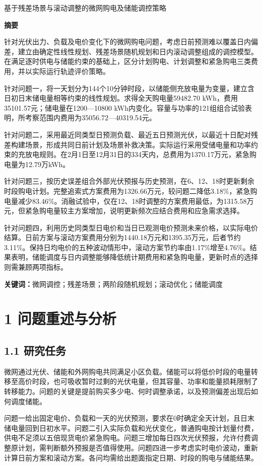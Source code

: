 \documentclass[UTF8,a4paper,zihao=-4,fontset=windows]{ctexart}
\begin{document}
\begin{center}{\heiti 基于残差场景与滚动调整的微网购电及储能调控策略}\end{center}
\begin{center}\large\bfseries 摘\quad 要\end{center}
针对光伏出力、负载及电价变化下的微网购电问题，考虑日前预测难以覆盖日内偏差，建立由确定性线性规划、残差场景随机规划和日内滚动调整组成的调控模型。在满足逐时供电与储能约束的基础上，区分计划购电、计划调整和紧急购电三类费用，并以实际运行轨迹评价策略。
\par
针对问题一，将一天划分为144个10分钟时段，以储能侧充放电量为变量，建立含日初日末储电量相等约束的线性规划。求得全天购电量59482.70 kWh，费用35101.57元；储电量在1200—10800 kWh内变化。容量与功率的121组组合试验表明，所考察范围内费用为35056.72—40319.54元。
\par
针对问题二，采用最近同类型日预测负载、最近五日预测光伏，以最近十日配对残差构建场景，形成共同日前计划及场景补救决策。实际运行采用受储电量和功率约束的充放电规则。在2月1日至12月31日的334天内，总费用为1370.17万元，紧急购电量为12.79万kWh。
\par
针对问题三，按历史误差组合外部光伏预报与历史预测，在6、12、18时更新剩余时段购电计划。完整追索式方案费用为1326.66万元，较问题二降低3.18\%，紧急购电量减少83.46\%。消融试验中，仅在12、18时调整的方案费用最低，为1315.58万元，但紧急购电量较主方案增加，说明更新频次应结合费用和应急需求选择。
\par
针对问题四，利用历史同类型日电价和当日已观测电价预测未来价格，以实际电价结算。日前方案与滚动方案费用分别为1440.18万元和1395.35万元，后者节约3.11\%。保持日均电价的五种波动情形中，滚动方案节约率由1.17\%增至4.76\%。结果表明，储能调度与日内调整能够降低统计期费用和紧急购电量，更新时点的选择则需兼顾两项指标。
\par
\textbf{关键词：}微网调控；残差场景；两阶段随机规划；滚动优化；储能调度
\par
\clearpage
\section{1 问题重述与分析}
\subsection{1.1 研究任务}
微网通过光伏、储能和外网购电共同满足小区负载。储能可以将低价时段的电量转移至高价时段，也可吸收暂时过剩的光伏电量，但其容量、功率和能量损耗限制了转移能力。问题的关键是提前购买多少电、何时调整承诺，以及预测偏差出现后如何调度储能。
\par
问题一给出固定电价、负载和一天的光伏预测，要求在0时确定全天计划，且日末储电量回到日初水平。问题二引入实际负载和光伏变化，普通购电按计划量付费，供电不足须以五倍现货电价紧急购电。问题三增加每日四次光伏预报，允许付费调整原计划，需判断额外预报是否值得使用。问题四进一步考虑实时电价波动，重新计算日前方案和滚动方案。各问均需给出题面指定日期、时段的购电与储能结果。
\par
\end{document}
